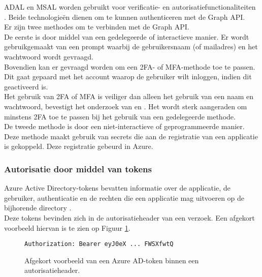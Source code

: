 \ac{ADAL} en \ac{MSAL} worden gebruikt voor verificatie- en autorisatiefunctionaliteiten \autocite{Ooms2022}. Beide technologieën dienen om te kunnen authenticeren met de Graph \ac{API}. \\ 

Er zijn twee methodes om te verbinden met de Graph \ac{API}. \\

De eerste is door middel van een gedelegeerde of interactieve manier. Er wordt gebruikgemaakt van een prompt waarbij de gebruikersnaam (of mailadres) en het wachtwoord wordt gevraagd. \\

Bovendien kan er gevraagd worden om een \ac{2FA}- of \ac{MFA}-methode toe te passen. Dit gaat gepaard met het account waarop de gebruiker wilt inloggen, indien dit geactiveerd is. \\

Het gebruik van \ac{2FA} of \ac{MFA} is veiliger dan alleen het gebruik van een naam en wachtwoord, bevestigt het onderzoek van \textcite{Gunson2011} en \textcite{Banyal2013}. Het wordt sterk aangeraden om minstens \ac{2FA} toe te passen bij het gebruik van een gedelegeerde methode. \\

De tweede methode is door een niet-interactieve of geprogrammeerde manier. Deze methode maakt gebruik van secrets die aan de registratie van een applicatie is gekoppeld. Deze registratie gebeurd in Azure. 



\subsubsection{Autorisatie door middel van tokens}

Azure Active Directory-tokens bevatten informatie over de applicatie, de gebruiker, authenticatie en de rechten die een applicatie mag uitvoeren op de bijhorende directory \autocite{Microsoft2015}. \\

Deze tokens bevinden zich in de autorisatieheader van een verzoek. Een afgekort voorbeeld hiervan is te zien op Figuur \ref{ahtoken}. \\

\begin{figure}[h]
    \begin{verbatim}Authorization: Bearer eyJ0eX ... FWSXfwtQ
    \end{verbatim}    
    \caption[Voorbeeld Azure AD-token]{Afgekort voorbeeld van een Azure \Ac{AD}-token binnen een autorisatieheader.}
    \label{ahtoken}
\end{figure}

